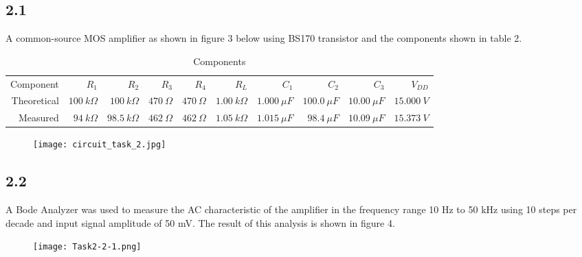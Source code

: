 \subsection*{2.1}
A common-source MOS amplifier as shown in figure 3 below using BS170 transistor and the components shown in table 2.

\begin{table}[htbp]
   \centering
   \caption{Components}
     \begin{tabular}{rrrrrrrrrr}
     Component   & $R_1$       & $R_2$       & $R_3$       & $R_4$       & $R_L$       & $C_1$       & $C_2$       & $C_3$       & $V_{DD}$ \\
     Theoretical & $100 \ k \Omega$ & $100 \ k \Omega$ & $470 \ \Omega$ & $470 \ \Omega$ & $1.00 \ k \Omega$ & $1.000 \ \mu F$ & $100.0 \ \mu F$ & $10.00 \ \mu F$ & $15.000 \ V$ \\
     Measured    & $94 \ k \Omega$ & $98.5 \ k \Omega$ & $462 \ \Omega$ & $462 \ \Omega$ & $1.05 \ k \Omega$ & $1.015 \ \mu F$ & $98.4 \ \mu F$ & $10.09 \ \mu F$ & $15.373 \ V$ \\
     \end{tabular}%
   \label{tab:addlabel}%
\end{table}%


    \begin{figure}[h!]
        \centering
        \texttt{[image: circuit\_task\_2.jpg]}
    \end{figure}


\pagebreak
\subsection*{2.2}


A Bode Analyzer was used to measure the AC characteristic of the amplifier in the frequency range 10 Hz to 50 kHz using 10 steps per decade and input signal amplitude of 50 mV. The result of this analysis is shown in figure 4.

    \begin{figure}[h!]
        \centering
        \texttt{[image: Task2-2-1.png]}
    \end{figure}

